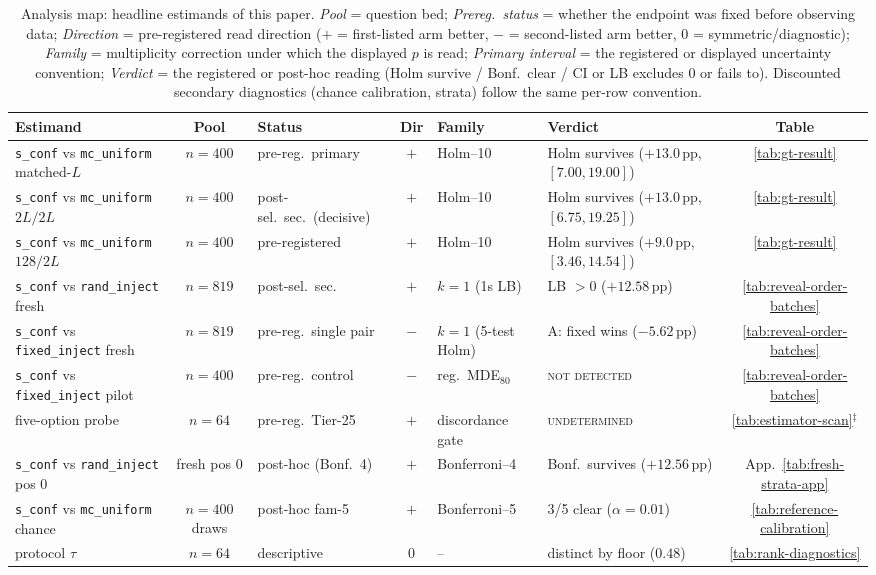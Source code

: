 \documentclass{article}
\newcommand{\sconf}{\texttt{s\_conf}}
\newcommand{\rinj}{\texttt{rand\_inject}}
\newcommand{\finj}{\texttt{fixed\_inject}}
\newcommand{\mcu}{\texttt{mc\_uniform}}
\newcommand{\pp}{\,\mathrm{pp}}
\begin{document}
\begin{table}[t]
\centering
\footnotesize
\setlength{\tabcolsep}{2.4pt}
\caption{Analysis map: headline estimands of this paper.
\emph{Pool} = question bed; \emph{Prereg.\ status} = whether the endpoint
was fixed before observing data;
\emph{Direction} = pre-registered read direction ($+$ = first-listed arm
better, $-$ = second-listed arm better, $0$ = symmetric/diagnostic);
\emph{Family} = multiplicity correction under which the displayed $p$ is
read; \emph{Primary interval} = the registered or displayed uncertainty
convention; \emph{Verdict} = the registered or post-hoc reading
(Holm survive / Bonf.\ clear / CI or LB excludes $0$ or fails to).
Discounted secondary diagnostics (chance calibration, strata) follow the
same per-row convention.}
\label{tab:analysis-map}
\begin{tabular}{@{}p{} c p{} c p{} p{} c @{}}
\toprule
Estimand & Pool & Status & Dir & Family & Verdict & Table \\
\midrule
\sconf{} vs \mcu{} matched-$L$ & $n{=}400$ & pre-reg.\ primary & $+$ & Holm--10 & Holm survives ($+13.0\pp$, $[7.00,19.00]$) & \ref{tab:gt-result} \\
\sconf{} vs \mcu{} $2L/2L$ & $n{=}400$ & post-sel.\ sec.\ (decisive) & $+$ & Holm--10 & Holm survives ($+13.0\pp$, $[6.75,19.25]$) & \ref{tab:gt-result} \\
\sconf{} vs \mcu{} $128/2L$ & $n{=}400$ & pre-registered & $+$ & Holm--10 & Holm survives ($+9.0\pp$, $[3.46,14.54]$) & \ref{tab:gt-result} \\
\sconf{} vs \rinj{} fresh & $n{=}819$ & post-sel.\ sec.\ & $+$ & $k{=}1$ (1s LB) & LB ${>}0$ ($+12.58\pp$) & \ref{tab:reveal-order-batches} \\
\sconf{} vs \finj{} fresh & $n{=}819$ & pre-reg.\ single pair & $-$ & $k{=}1$ (5-test Holm) & A: fixed wins ($-5.62\pp$) & \ref{tab:reveal-order-batches} \\
\sconf{} vs \finj{} pilot & $n{=}400$ & pre-reg.\ control & $-$ & reg.\ MDE$_{80}$ & \textsc{not detected} & \ref{tab:reveal-order-batches} \\
five-option probe & $n{=}64$ & pre-reg.\ Tier-25 & $+$ & discordance gate & \textsc{undetermined} & \ref{tab:estimator-scan}$^{\ddagger}$ \\
\sconf{} vs \rinj{} pos $0$ & fresh pos $0$ & post-hoc (Bonf.\ 4) & $+$ & Bonferroni--4 & Bonf.\ survives ($+12.56\pp$) & App.~\ref{tab:fresh-strata-app} \\
\sconf{} vs \mcu{} chance & $n{=}400$ draws & post-hoc fam-5 & $+$ & Bonferroni--5 & 3/5 clear ($\alpha{=}0.01$) & \ref{tab:reference-calibration} \\
protocol $\tau$ & $n{=}64$ & descriptive & $0$ & -- & distinct by floor ($0.48$) & \ref{tab:rank-diagnostics} \\
\bottomrule
\end{tabular}
\vspace{2pt}


\end{table}
\end{document}
